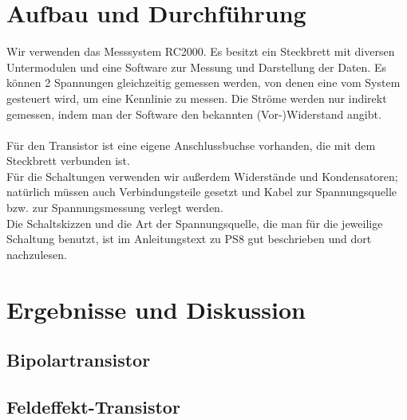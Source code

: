 \documentclass[12pt,a4paper,twopage]{article}
\begin{document}
\section{Aufbau und Durchführung}
Wir verwenden das Messsystem RC2000. Es besitzt ein Steckbrett mit diversen Untermodulen und eine Software zur Messung und Darstellung der Daten. Es können 2 Spannungen gleichzeitig gemessen werden, von denen eine vom System gesteuert wird, um eine Kennlinie zu messen. Die Ströme werden nur indirekt gemessen, indem man der Software den bekannten (Vor-)Widerstand angibt.\\
\\
Für den Transistor ist eine eigene Anschlussbuchse vorhanden, die mit dem Steckbrett verbunden ist.\\
Für die Schaltungen verwenden wir außerdem Widerstände und Kondensatoren; natürlich müssen auch Verbindungsteile gesetzt und Kabel zur Spannungsquelle bzw. zur Spannungsmessung verlegt werden.\\
Die Schaltskizzen und die Art der Spannungsquelle, die man für die jeweilige Schaltung benutzt, ist im Anleitungstext zu PS8 gut beschrieben und dort nachzulesen.

\section{Ergebnisse und Diskussion}
\subsection{Bipolartransistor}
\subsection{Feldeffekt-Transistor}


						
\end{document}
